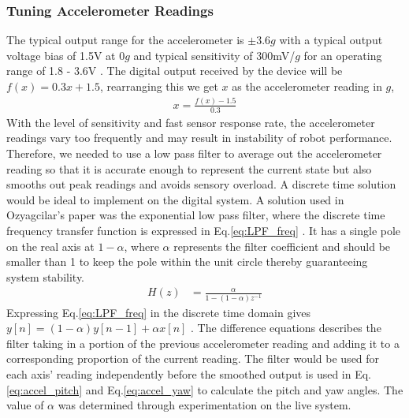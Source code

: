 \subsubsection{Tuning Accelerometer Readings}\label{sec:accelerometer_LPF}
\vspace{-0.2cm} The typical output range for the accelerometer is $\pm 3.6g$ with a typical output voltage bias of 1.5V at 0$g$ and typical sensitivity of 300mV/$g$ for an operating range of 1.8 - 3.6V \cite{ADXL330}. The digital output received by the device will be $f(x) = 0.3x + 1.5$, rearranging this we get $x$ as the accelerometer reading in $g$,
\begin{align}
    x = \frac{f(x) - 1.5}{0.3}
\end{align}
With the level of sensitivity and fast sensor response rate, the accelerometer readings vary too frequently and may result in instability of robot performance. Therefore, we needed to use a low pass filter to average out the accelerometer reading so that it is accurate enough to represent the current state but also smooths out peak readings and avoids sensory overload. A discrete time solution would be ideal to implement on the digital system. A solution used in Ozyagcilar's paper was the exponential low pass filter, where the discrete time frequency transfer function is expressed in Eq.\ref{eq:LPF_freq} \cite[p.~16]{ozyagcilar}. It has a single pole on the real axis at $1 - \alpha$, where $\alpha$ represents the filter coefficient and should be smaller than 1 to keep the pole within the unit circle thereby guaranteeing system stability. 
\begin{align}
    H(z) &= \frac{\alpha}{1 - (1 -\alpha)z^{-1}}\label{eq:LPF_freq}
\end{align}
Expressing Eq.\ref{eq:LPF_freq} in the discrete time domain gives $y[n] = (1 - \alpha) y[n - 1] + \alpha x[n]$ \cite[p.~16]{ozyagcilar}. The difference equations describes the filter taking in a portion of the previous accelerometer reading and adding it to a corresponding proportion of the current reading. The filter would be used for each axis' reading independently before the smoothed output is used in Eq.\ref{eq:accel_pitch} and Eq.\ref{eq:accel_yaw} to calculate the pitch and yaw angles. The value of $\alpha$ was determined through experimentation on the live system.